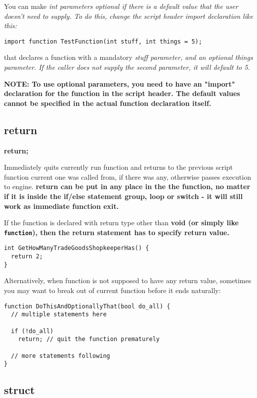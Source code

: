 You can make \it{int} parameters optional if there is a default value that the user
doesn't need to supply. To do this, change the script header \it{import} declaration like this:
\begin{verbatim}
import function TestFunction(int stuff, int things = 5);
\end{verbatim}
that declares a function with a mandatory \it{stuff} parameter, and an optional \it{things}
parameter. If the caller does not supply the second parameter, it will default to 5.

\bf{NOTE:} To use optional parameters, you need to have an "import" declaration for the function
in the script header. The default values cannot be specified in the actual function declaration
itself.


\subsection{return}\label{returnstatement}%

\bf{return};

Immediately quits currently run function and returns to the previous script function current one
was called from, if there was any, otherwise passes execution to engine.
\bf{return} can be put in any place in the the function, no matter if it is inside the
if/else statement group, loop or switch - it will still work as immediate function exit.

If the function is declared with return type other than \bf{void} (or simply like \verb$function$),
then the \bf{return} statement \bf{has} to specify \bf{return value}.

\begin{verbatim}
int GetHowManyTradeGoodsShopkeeperHas() {
  return 2;
}
\end{verbatim}

Alternatively, when function is not supposed to have any return value, sometimes you may want to break
out of current function before it ends naturally:

\begin{verbatim}
function DoThisAndOptionallyThat(bool do_all) {
  // multiple statements here
  
  if (!do_all)
    return; // quit the function prematurely
    
  // more statements following
}
\end{verbatim}


\subsection{struct}\label{struct}%

